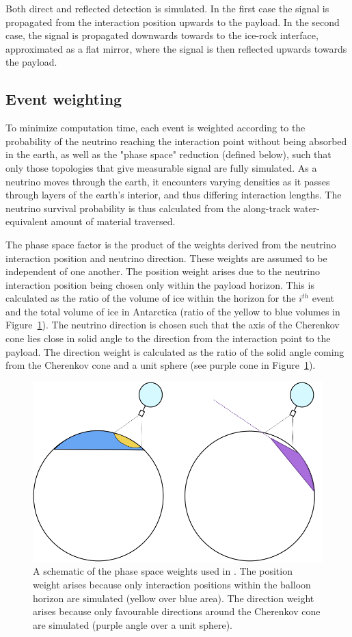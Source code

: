 Both direct and reflected detection is simulated.
In the first case the signal is propagated from the interaction position upwards to the payload. In the second case, the signal is propagated downwards
towards to the ice-rock interface, approximated as a flat mirror,
where the signal is then reflected upwards towards the payload. 


\subsection{Event weighting}
\label{sec:weights}
To minimize computation time,
each event is weighted according to the probability of the neutrino reaching the interaction point without being absorbed in the earth, as well as
the "phase space" reduction (defined below), such that only those topologies that give measurable signal are fully simulated. 
As a neutrino moves through the earth, it encounters varying
densities as it passes through layers of the earth's interior,
and thus differing interaction lengths. 
The neutrino survival probability is thus calculated from the along-track
water-equivalent amount of material traversed.

The phase space factor is the product of the weights derived from the neutrino interaction position and neutrino direction.
These weights are assumed to be independent of one another.
The position weight arises due to the neutrino interaction position being
chosen only within the payload horizon.
This is calculated as
the ratio of the volume of ice within the horizon for the $i^{th}$
event and the total volume of ice in Antarctica (ratio of the yellow to blue
volumes in Figure~\ref{fig:weights}).
The neutrino direction is chosen such that the axis of the Cherenkov cone
lies close in solid angle to the direction from the interaction point to the payload. 
The direction weight is calculated as the ratio of the solid angle coming from the Cherenkov cone and a unit sphere (see purple cone in Figure~\ref{fig:weights}).


\begin{figure}[!h]\centering
  \includegraphics[width=.8\linewidth, trim = 0 6.5cm 0 0, clip]{./Figs/icemcWeightScheme.png}
  \caption{A schematic of the phase space weights used in \icemc. The
    position weight arises because only interaction positions within
    the balloon horizon are simulated (yellow over blue area).
  The direction weight arises because only favourable directions around the
  Cherenkov cone are simulated (purple angle over a unit sphere).}
  \label{fig:weights}
\end{figure}
